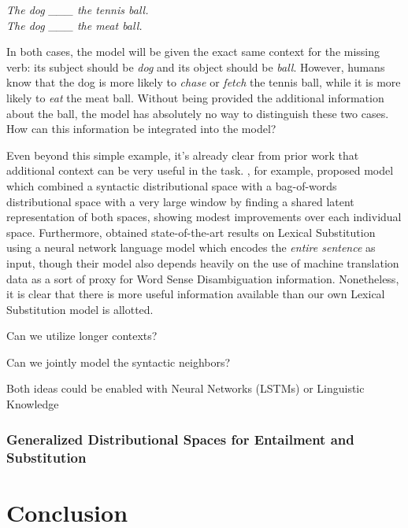 \documentclass[letterpaper]{article}
\begin{document}
\begin{center}
  {\em The dog \_\_\_ the tennis ball.}\\
  {\em The dog \_\_\_ the meat ball.}
\end{center}

In both cases, the model will be given the exact same context for the missing
verb: its subject should be {\em dog} and its object should be {\em ball}. However,
humans know that the dog is more likely to {\em chase} or {\em fetch} the tennis
ball, while it is more likely to {\em eat} the meat ball. Without being provided
the additional information about the ball, the model has absolutely no way
to distinguish these two cases. How can this information be integrated into the
model?

Even beyond this simple example, it's already clear from prior work that
additional context can be very useful in the task.
, for example, proposed model which combined
a syntactic distributional space with a bag-of-words distributional space with
a very large window by finding a shared latent representation of both spaces,
showing modest improvements over each individual space. Furthermore,
 obtained state-of-the-art results on Lexical
Substitution using a neural network language model which encodes the {\em
entire sentence} as input, though their model also depends heavily on the use
of machine translation data as a sort of proxy for Word Sense Disambiguation
information. Nonetheless, it is clear that there is more useful information
available than our own Lexical Substitution model is allotted.

Can we utilize longer contexts?

Can we jointly model the syntactic neighbors?

Both ideas could be enabled with Neural Networks (LSTMs) or Linguistic Knowledge

\subsubsection{Generalized Distributional Spaces for Entailment and Substitution}

\section{Conclusion}

\pagebreak


\end{document}
